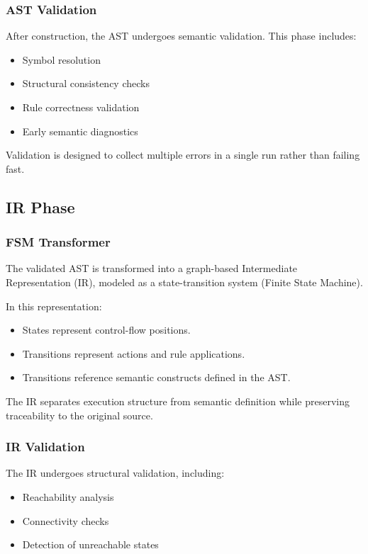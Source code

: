 \documentclass[a4paper,11pt]{article}
\begin{document}
\subsubsection{AST Validation}

After construction, the AST undergoes semantic validation. This phase includes:

\begin{itemize}
    \item Symbol resolution
    \item Structural consistency checks
    \item Rule correctness validation
    \item Early semantic diagnostics
\end{itemize}

Validation is designed to collect multiple errors in a single run rather
than failing fast.

\subsection{IR Phase}

\subsubsection{FSM Transformer}

The validated AST is transformed into a graph-based Intermediate Representation (IR),
modeled as a state-transition system (Finite State Machine).

In this representation:

\begin{itemize}
    \item States represent control-flow positions.
    \item Transitions represent actions and rule applications.
    \item Transitions reference semantic constructs defined in the AST.
\end{itemize}

The IR separates execution structure from semantic definition while
preserving traceability to the original source.

\subsubsection{IR Validation}

The IR undergoes structural validation, including:

\begin{itemize}
    \item Reachability analysis
    \item Connectivity checks
    \item Detection of unreachable states
\end{itemize}
\end{document}

